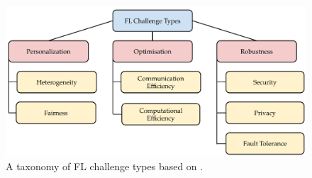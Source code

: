 \begin{figure}[hbtp]
  \centering
  \includegraphics[width=\textwidth]{figures/fl_challenge_types_taxonomy.pdf}
  \caption{A taxonomy of FL challenge types based on \cite{fl_taxonomy_2024}.}
  \label{fig:fl_challenge_types_taxonomy}
\end{figure}